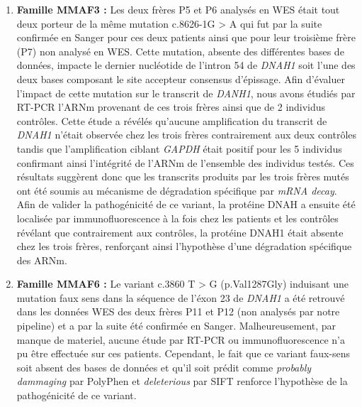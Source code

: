 \documentclass[12pt,twoside]{ugathesis}
\begin{document}
\begin{enumerate}
\def\labelenumi{\arabic{enumi}.}
\item
  \textbf{Famille MMAF3 :} Les deux frères P5 et P6 analysés en WES
  était tout deux porteur de la même mutation c.8626-1G \textgreater{} A
  qui fut par la suite confirmée en Sanger pour ces deux patients ainsi
  que pour leur troisième frère (P7) non analysé en WES. Cette mutation,
  absente des différentes bases de données, impacte le dernier
  nucléotide de l'intron 54 de \emph{DNAH1} soit l'une des deux bases
  composant le site accepteur consensus d'épissage. Afin d'évaluer
  l'impact de cette mutation sur le transcrit de \emph{DANH1}, nous
  avons étudiés par RT-PCR l'ARNm provenant de ces trois frères ainsi
  que de 2 individus contrôles. Cette étude a révélés qu'aucune
  amplification du transcrit de \emph{DNAH1} n'était observée chez les
  trois frères contrairement aux deux contrôles tandis que
  l'amplification ciblant \emph{GAPDH} était positif pour les 5
  individus confirmant ainsi l'intégrité de l'ARNm de l'ensemble des
  individus testés. Ces résultats suggèrent donc que les transcrits
  produits par les trois frères mutés ont été soumis au mécanisme de
  dégradation spécifique par \emph{mRNA decay}. Afin de valider la
  pathogénicité de ce variant, la protéine DNAH a ensuite été localisée
  par immunofluorescence à la fois chez les patients et les contrôles
  révélant que contrairement aux contrôles, la protéine DNAH1 était
  absente chez les trois frères, renforçant ainsi l'hypothèse d'une
  dégradation spécifique des ARNm.
\item
  \textbf{Famille MMAF6 :} Le variant c.3860 T \textgreater{} G
  (p.Val1287Gly) induisant une mutation faux sens dans la séquence de
  l'éxon 23 de \emph{DNAH1} a été retrouvé dans les données WES des deux
  frères P11 et P12 (non analysés par notre pipeline) et a par la suite
  été confirmée en Sanger. Malheureusement, par manque de materiel,
  aucune étude par RT-PCR ou immunofluorescence n'a pu être effectuée
  sur ces patients. Cependant, le fait que ce variant faux-sens soit
  absent des bases de données et qu'il soit prédit comme \emph{probably
  dammaging} par PolyPhen et \emph{deleterious} par SIFT renforce
  l'hypothèse de la pathogénicité de ce variant.
\end{enumerate}
\end{document}
